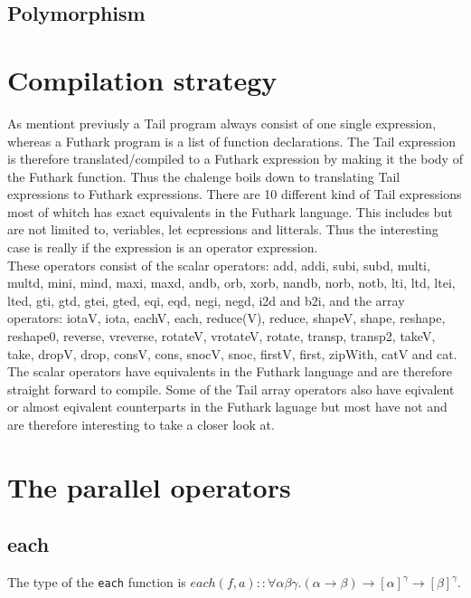 \documentclass[11pt]{article}
\begin{document}
\subsection{Polymorphism}

\section{Compilation strategy}
As mentiont previusly a Tail program always consist of one single expression, whereas a Futhark program is a list of function declarations. The Tail expression is therefore translated/compiled to a Futhark expression by making it the body of the Futhark function. 
Thus the chalenge boils down to translating Tail expressions to Futhark expressions. 
There are 10 different kind of Tail expressions most of whitch has exact equivalents in the Futhark language. This includes but are not limited to, veriables, let ecpressions and litterals. Thus the interesting case is really if the expression is an operator expression. \\

These operators consist of the scalar operators: add, addi, subi, subd, multi, multd, mini, mind, maxi, maxd, andb, orb, xorb, nandb, norb, notb, lti, ltd, ltei, lted, gti, gtd, gtei, gted, eqi, eqd, negi, negd, i2d and b2i, and the array operators: iotaV, iota, eachV, each, reduce(V), reduce, shapeV, shape, reshape, reshape0, reverse, vreverse, rotateV, vrotateV, rotate, transp, transp2, takeV, take, dropV, drop, consV, cons, snocV, snoc, firstV, first, zipWith, catV and cat. \\

The scalar operators have equivalents in the Futhark language and are therefore straight forward to compile. Some of the Tail array operators also have eqivalent or almost eqivalent counterparts in the Futhark laguage but most have not and are therefore interesting to take a closer look at.

\section{The parallel operators}

\subsection{each}

The type of the {\tt each} function is $each(f,a) :: \forall\alpha\beta\gamma.(\alpha \to \beta) \to [\alpha]^\gamma \to [\beta]^\gamma$.
\end{document}
